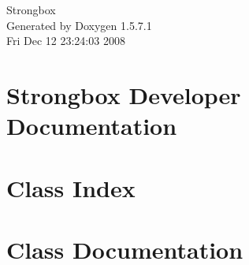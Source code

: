 \documentclass[a4paper]{book}
\begin{document}
\begin{titlepage}
\vspace*{7cm}
\begin{center}
{\Large Strongbox }\\
\vspace*{1cm}
{\large Generated by Doxygen 1.5.7.1}\\
\vspace*{0.5cm}
{\small Fri Dec 12 23:24:03 2008}\\
\end{center}
\end{titlepage}
\clearemptydoublepage
{}
\tableofcontents
\clearemptydoublepage
{}
\chapter{Strongbox Developer Documentation}
\label{index}\hypertarget{index}{}
\chapter{Class Index}

\chapter{Class Documentation}

















\printindex
\end{document}
